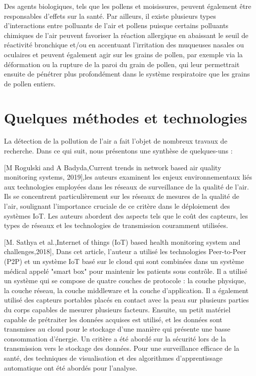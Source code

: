 \documentclass{report}
\begin{document}
Des agents biologiques, tels que les pollens et moisissures, peuvent également être responsables d’effets sur la santé. Par ailleurs, il existe plusieurs types d’interactions entre polluants de l’air et pollens puisque certains polluants chimiques de l’air peuvent favoriser la réaction allergique en abaissant le seuil de réactivité bronchique et/ou en accentuant l’irritation des muqueuses nasales ou oculaires et peuvent également agir sur les grains de pollen, par exemple via la déformation ou la rupture de la paroi du grain de pollen, qui leur permettrait ensuite de pénétrer plus profondément dans le système respiratoire que les grains de pollen entiers.
\cite{} 

\section{Quelques méthodes et technologies}
La détection de la pollution de l'air a fait l'objet de nombreux travaux de recherche. Dans ce qui suit, nous présentons une synthèse de quelques-uns :

[M Rogulski and A Badyda,Current trends in network based air quality monitoring systems, 2019],les auteurs examinent les enjeux environnementaux liés aux technologies employées dans les réseaux de surveillance de la qualité de l'air. Ils se concentrent particulièrement sur les réseaux de mesures de la qualité de l’air, soulignant l'importance cruciale de ce critère dans le déploiement des systèmes IoT. Les auteurs abordent des aspects tels que le coût des capteurs, les types de réseaux et les technologies de transmission couramment utilisées. 
\vspace*{0.5cm}

[M. Sathya et al.,Internet of things (IoT) based health monitoring system and challenges,2018], Dans cet article, l’auteur a utilisé les technologies Peer-to-Peer (P2P) et un système IoT basé sur le cloud qui sont combinées dans un système médical appelé "smart box" pour maintenir les patients sous contrôle. Il a utilisé un système qui se compose de quatre couches de protocole : la couche physique, la couche réseau, la couche middleware et la couche d'application. Il a également utilisé des capteurs portables placés en contact avec la peau sur plusieurs parties du corps capables de mesurer plusieurs facteurs. Ensuite, un petit matériel capable de prétraiter les données acquises est utilisé, et les données sont transmises au cloud pour le stockage d’une manière qui présente une basse consommation d'énergie.
Un critère a été abordé sur la sécurité lors de la transmission vers le stockage des données. Pour une surveillance efficace de la santé, des techniques de visualisation et des algorithmes d'apprentissage automatique ont été abordés pour l’analyse.
\end{document}
